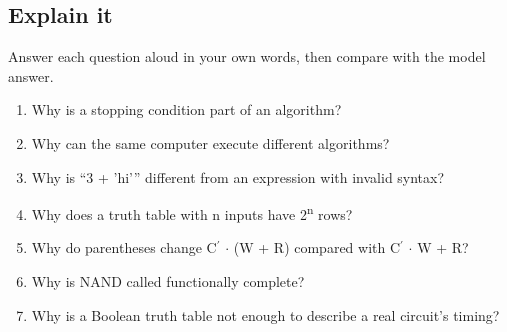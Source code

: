 \documentclass[11pt]{article}
\begin{document}
\begin{keepsection}
\section{Explain it}

Answer each question aloud in your own words, then compare with the model answer.

\begin{enumerate}
\item Why is a stopping condition part of an algorithm?
\item Why can the same computer execute different algorithms?
\item Why is “3 + 'hi'” different from an expression with invalid syntax?
\item Why does a truth table with n inputs have 2\textsuperscript{n} rows?
\item Why do parentheses change C\ensuremath{{}^{\prime}} \ensuremath{\cdot} (W + R) compared with C\ensuremath{{}^{\prime}} \ensuremath{\cdot} W + R?
\item Why is NAND called functionally complete?
\item Why is a Boolean truth table not enough to describe a real circuit's timing?
\end{enumerate}

\end{keepsection}

\clearpage
\end{document}
